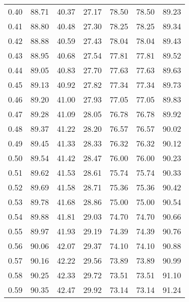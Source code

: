 \begin{tabular}{|c|c|c|c|c|c|c|}
      0.40 &     88.71 &     40.37 &      27.17 &   78.50 &      78.50 &         89.23 \\
      0.41 &     88.80 &     40.48 &      27.30 &   78.25 &      78.25 &         89.34 \\
      0.42 &     88.88 &     40.59 &      27.43 &   78.04 &      78.04 &         89.43 \\
      0.43 &     88.95 &     40.68 &      27.54 &   77.81 &      77.81 &         89.52 \\
      0.44 &     89.05 &     40.83 &      27.70 &   77.63 &      77.63 &         89.63 \\
      0.45 &     89.13 &     40.92 &      27.82 &   77.34 &      77.34 &         89.73 \\
      0.46 &     89.20 &     41.00 &      27.93 &   77.05 &      77.05 &         89.83 \\
      0.47 &     89.28 &     41.09 &      28.05 &   76.78 &      76.78 &         89.92 \\
      0.48 &     89.37 &     41.22 &      28.20 &   76.57 &      76.57 &         90.02 \\
      0.49 &     89.45 &     41.33 &      28.33 &   76.32 &      76.32 &         90.12 \\
      0.50 &     89.54 &     41.42 &      28.47 &   76.00 &      76.00 &         90.23 \\
      0.51 &     89.62 &     41.53 &      28.61 &   75.74 &      75.74 &         90.33 \\
      0.52 &     89.69 &     41.58 &      28.71 &   75.36 &      75.36 &         90.42 \\
      0.53 &     89.78 &     41.68 &      28.86 &   75.00 &      75.00 &         90.54 \\
      0.54 &     89.88 &     41.81 &      29.03 &   74.70 &      74.70 &         90.66 \\
      0.55 &     89.97 &     41.93 &      29.19 &   74.39 &      74.39 &         90.76 \\
      0.56 &     90.06 &     42.07 &      29.37 &   74.10 &      74.10 &         90.88 \\
      0.57 &     90.16 &     42.22 &      29.56 &   73.89 &      73.89 &         90.99 \\
      0.58 &     90.25 &     42.33 &      29.72 &   73.51 &      73.51 &         91.10 \\
      0.59 &     90.35 &     42.47 &      29.92 &   73.14 &      73.14 &         91.24 \\

\end{tabular}
